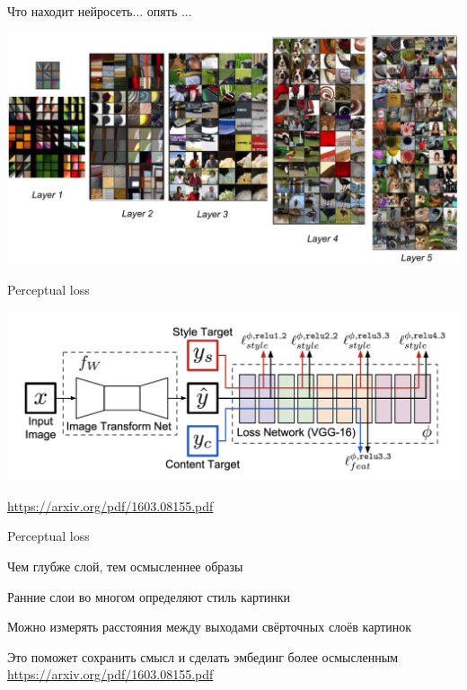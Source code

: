 \documentclass[notes,12pt, aspectratio=169]{beamer}
\newenvironment{wideitemize}{\itemize\addtolength{\itemsep}{10pt}}{\enditemize}
\begin{document}
\begin{frame}{Что находит нейросеть... опять ...}
	\begin{center}
			\includegraphics[width=.85\linewidth]{cnn_vis.png}
		\end{center}
\end{frame}


\begin{frame}{Perceptual loss}
	\begin{center}
			\includegraphics[width=.8\linewidth]{perceptual_loss.png}
		\end{center}
	\vfill
	\footnotesize
	{\color{blue} \url{https://arxiv.org/pdf/1603.08155.pdf}} 
\end{frame}


\begin{frame}{Perceptual loss}
\begin{wideitemize}
	\item  Чем глубже слой, тем осмысленнее образы
	\item  Ранние слои во многом определяют стиль картинки
	\item  Можно измерять расстояния между выходами свёрточных слоёв картинок
	\item  Это поможет сохранить смысл и сделать эмбединг более осмысленным
\end{wideitemize}
	\vfill
\footnotesize
{\color{blue} \url{https://arxiv.org/pdf/1603.08155.pdf}} 
\end{frame}
\end{document}
